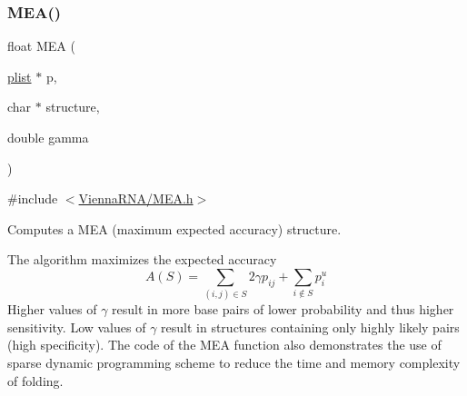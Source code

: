 \subsubsection{\texorpdfstring{M\+E\+A()}{MEA()}}
{\footnotesize\ttfamily float M\+EA (\begin{DoxyParamCaption}\item[{\hyperlink{group__data__structures_ga9608eed021ebfbdd7a901cfdc446c8e9}{plist} $\ast$}]{p,  }\item[{char $\ast$}]{structure,  }\item[{double}]{gamma }\end{DoxyParamCaption})}



{\ttfamily \#include $<$\hyperlink{MEA_8h}{Vienna\+R\+N\+A/\+M\+E\+A.\+h}$>$}



Computes a M\+EA (maximum expected accuracy) structure. 

The algorithm maximizes the expected accuracy \[ A(S) = \sum_{(i,j) \in S} 2 \gamma p_{ij} + \sum_{i \notin S} p^u_i \] Higher values of $\gamma$ result in more base pairs of lower probability and thus higher sensitivity. Low values of $\gamma$ result in structures containing only highly likely pairs (high specificity). The code of the M\+EA function also demonstrates the use of sparse dynamic programming scheme to reduce the time and memory complexity of folding. 